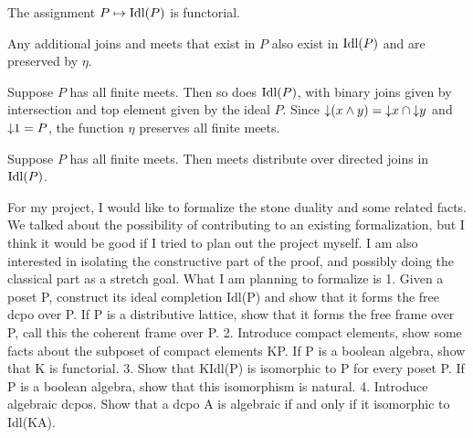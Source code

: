 \begin{corollary}
  The assignment \(P \mapsto \operatorname{Idl}(P)\) is functorial.
\end{corollary}

Any additional joins and meets that exist in \(P\) also exist in \(\operatorname{Idl}(P)\) and are preserved by \(\eta\).

\begin{proposition}
  Suppose \(P\) has all finite meets. Then so does \(\operatorname{Idl}(P)\), with binary joins given by intersection and top element given by the ideal \(P\).
  Since \({\downarrow}(x \wedge y) = {\downarrow}x \cap {\downarrow}y\) and \({\downarrow}1 = P\), the function \(\eta\) preserves all finite meets.
\end{proposition}

\begin{proposition}
  Suppose \(P\) has all finite meets. Then meets distribute over directed joins in \(\operatorname{Idl}(P)\).
\end{proposition}

For my project, I would like to formalize the stone duality and some related facts. We talked about the possibility of contributing to an existing formalization, but I think it would be good if I tried to plan out the project myself. I am also interested in isolating the constructive part of the proof, and possibly doing the classical part as a stretch goal. What I am planning to formalize is
1. Given a poset P, construct its ideal completion Idl(P) and show that it forms the free dcpo over P. If P is a distributive lattice, show that it forms the free frame over P, call this the coherent frame over P.
2. Introduce compact elements, show some facts about the subposet of compact elements KP. If P is a boolean algebra, show that K is functorial.
3. Show that KIdl(P) is isomorphic to P for every poset P. If P is a boolean algebra, show that this isomorphism is natural.
4. Introduce algebraic dcpos. Show that a dcpo A is algebraic if and only if it isomorphic to Idl(KA).
